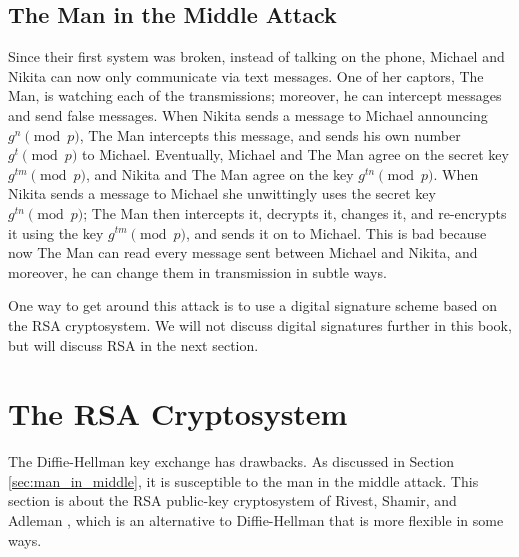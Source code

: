 \subsection{The Man in the Middle Attack}
\label{sec:man_in_middle}
\par\noindent{}Since
their first system was broken, instead of talking on the phone,
Michael and Nikita can now only communicate via text messages.  One of
her captors, The Man, is watching each of the
transmissions; moreover, he can intercept messages and send false
messages.  When Nikita sends a message to Michael announcing
$g^n\pmod{p}$, The Man intercepts this message, and sends his own
number $g^t\pmod{p}$ to Michael.  Eventually, Michael and The Man
agree on the secret key $g^{tm}\pmod{p}$, and Nikita and The Man agree
on the key $g^{tn}\pmod{p}$.  When Nikita sends a message to Michael
she unwittingly uses the secret key $g^{tn}\pmod{p}$; The Man then
intercepts it, decrypts it, changes it, and re-encrypts it using the
key $g^{tm}\pmod{p}$, and sends it on to Michael.
This is bad because now The Man can read every message sent between
Michael and Nikita, and moreover, he can change them in transmission
in subtle ways.



One way to get around this attack is to use a digital signature scheme
based on the RSA cryptosystem.  We will not discuss digital signatures
further  in this book, but will discuss RSA in the
next section.


\section{The RSA Cryptosystem}
\label{sec:RSA}\label{sec:rsa}

The Diffie-Hellman key exchange has drawbacks.  As discussed in
Section \ref{sec:man_in_middle}, it is susceptible to the man in the
middle attack. This section is about the RSA public-key cryptosystem of
Rivest, Shamir, and Adleman \cite{rsa:origin}, which is an alternative
to Diffie-Hellman that is more flexible in some ways.

